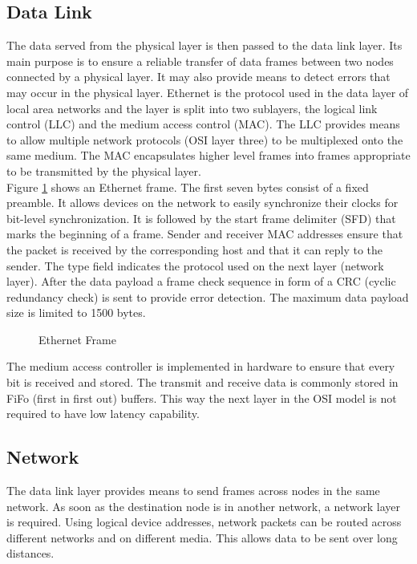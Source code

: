 \subsection{Data Link} 
The data served from the physical layer is then passed to the data link layer.
Its main purpose is to ensure a reliable transfer of data frames between two
nodes connected by a physical layer. It may also provide means to detect errors
that may occur in the physical layer. Ethernet is the protocol used in the data
layer of local area networks and the layer is split into two sublayers, the logical link control (LLC) and the medium access control (MAC). The LLC provides means to allow multiple network protocols (OSI layer three) to be multiplexed onto the same medium. The MAC encapsulates higher level frames into frames appropriate to be transmitted by the physical layer.
\\

Figure \ref{fig:eth} shows an Ethernet frame. The first seven bytes consist of a fixed preamble. It allows devices on the network to easily synchronize their 
clocks for bit-level synchronization. It is followed by the start frame delimiter (SFD) that marks the beginning of a frame. Sender and receiver MAC addresses ensure that the packet is received by the corresponding host and that it can reply to the sender. The type field indicates the protocol used on the next layer (network layer). After the data payload a frame check sequence in form of a CRC (cyclic redundancy check) is sent to provide error detection. The maximum data payload size is limited to 1500 bytes.
\\

\begin{figure}[tb!]
    \centering
    \begin{adjustbox}{max width=\textwidth}
        
    \end{adjustbox}
    \caption{Ethernet Frame}
    \label{fig:eth}
\end{figure}
The medium access controller is implemented in hardware to ensure that every bit is received and stored. The transmit and receive data is commonly stored in
FiFo (first in first out) buffers. This way the next layer in the OSI model is
not required to have low latency capability.


\subsection{Network} 
The data link layer provides means to send frames across nodes in the same
network. As soon as the destination node is in another network, a network layer
is required. Using logical device addresses, network packets can be routed
across different networks and on different media. This allows data to be sent
over long distances.
\\

